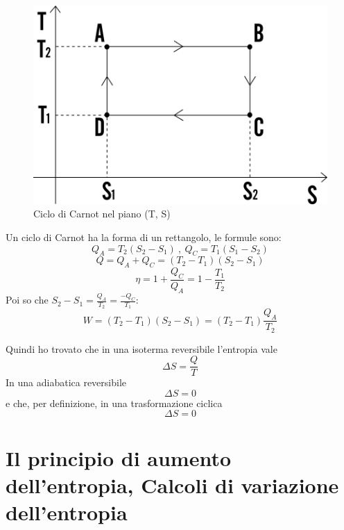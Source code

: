 \documentclass[class=book, crop=false, oneside, 12pt]{standalone}
\begin{document}
\begin{figure}[h]
    \includegraphics[scale=0.4]{ciclo-carnot-piano-t-s}
    \centering
    \caption{Ciclo di Carnot nel piano (T, S)}
\end{figure}

Un ciclo di Carnot ha la forma di un rettangolo, le formule sono:
\begin{equation*}
    Q_A = T_2 \left(S_2 - S_1\right) \ , \ Q_C = T_1 \left(S_1 - S_2\right)
\end{equation*}
\begin{equation*}
    Q = Q_A + Q_C = \left(T_2 - T_1 \right) \left(S_2 - S_1\right)
\end{equation*}
\begin{equation*}
    \eta = 1 + \frac{Q_C}{Q_A} = 1- \frac{T_1}{T_2}
\end{equation*}
Poi so che \(S_2 - S_1 = \frac{Q_A}{T_2} = \frac{-Q_C}{T_1}\):
\begin{equation*}
    W = \left(T_2 - T_1\right) \left(S_2 - S_1\right) = \left(T_2 - T_1 \right) \frac{Q_A}{T_2}
\end{equation*}

Quindi ho trovato che in una isoterma reversibile l'entropia vale
\begin{equation}
    \Delta S = \frac{Q}{T}
\end{equation}
In una adiabatica reversibile
\begin{equation}
    \Delta S = 0
\end{equation}
e che, per definizione, in una trasformazione ciclica
\begin{equation} \label{entropia_trasformazione_ciclica}
    \Delta S = 0
\end{equation}

\section{Il principio di aumento dell'entropia, Calcoli di variazione dell'entropia}
\end{document}
